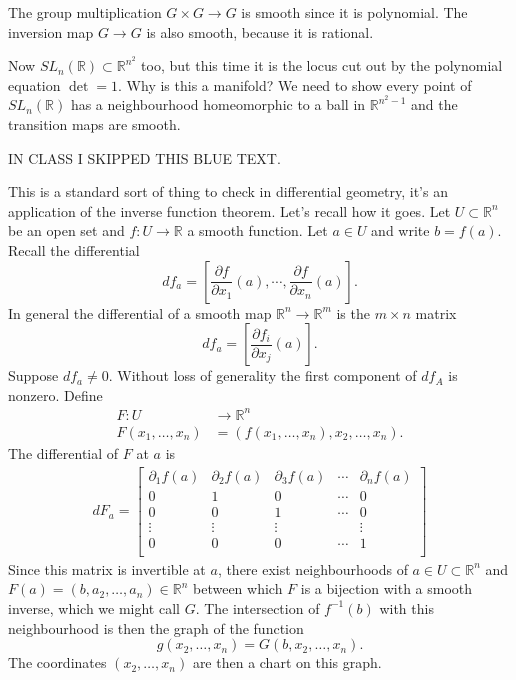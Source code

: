 \documentclass[12pt]{article}
\theoremstyle{plain}
\theoremstyle{definition}
\numberwithin{equation}{section}
\newcommand{\R}{\mathbb{R}}
\begin{document}
The group multiplication $G \times G \rightarrow G$ is smooth since it is polynomial. The inversion map $G \rightarrow G$ is also smooth, because it is rational.

Now $SL_n(\R) \subset \R^{n^2}$ too, but this time it is the locus cut out by the polynomial equation $\det = 1$. Why is this a manifold? We need to show every point of $SL_n(\R)$ has a neighbourhood homeomorphic to a ball in $\R^{n^2-1}$ and the transition maps are smooth.

{\color{blue}

IN CLASS I SKIPPED THIS BLUE TEXT.

This is a standard sort of thing to check in differential geometry, it's an application of the inverse function theorem. Let's recall how it goes. Let $U \subset \R^n$ be an open set and $f : U \rightarrow \R$ a smooth function. Let $a \in U$ and write $b = f(a)$. Recall the differential
\[
df_a = [\frac{\partial f}{\partial x_1}(a), \cdots, \frac{\partial f}{\partial x_n}(a)].
\]
In general the differential of a smooth map $\R^n \rightarrow \R^m$ is the $m \times n$ matrix
\[
df_a = [\frac{\partial f_i}{\partial x_j}(a)].
\]
Suppose $df_a \neq 0$. Without loss of generality the first component of $df_A$ is nonzero. Define
\begin{align*}
F : U &\rightarrow \R^n \\
%
F(x_1, \ldots, x_n) &= (f(x_1, \ldots, x_n), x_2, \ldots, x_n).
\end{align*}
The differential of $F$ at $a$ is
\begin{align*}
dF_a = \left[
\begin{array}{ccccc}
\partial_1 f(a) & \partial_2 f(a) & \partial_3 f(a) & \cdots & \partial_n f(a) \\
%
0 & 1 & 0 & \cdots & 0 \\
%
0 & 0 & 1 & \cdots & 0 \\
%
\vdots & \vdots & \vdots &  & \vdots \\
%
0 & 0 & 0 & \cdots & 1 \\
\end{array}
\right]
\end{align*}
Since this matrix is invertible at $a$, there exist neighbourhoods of $a \in U \subset \R^n$ and $F(a) = (b, a_2, \ldots, a_n) \in \R^n$ between which $F$ is a bijection with a smooth inverse, which we might call $G$. The intersection of $f^{-1}(b)$ with this neighbourhood is then the graph of the function
\[
g(x_2, \ldots, x_n) =  G(b, x_2, \ldots, x_n).
\]
The coordinates $(x_2, \ldots, x_n)$ are then a chart on this graph.

}
\end{document}
